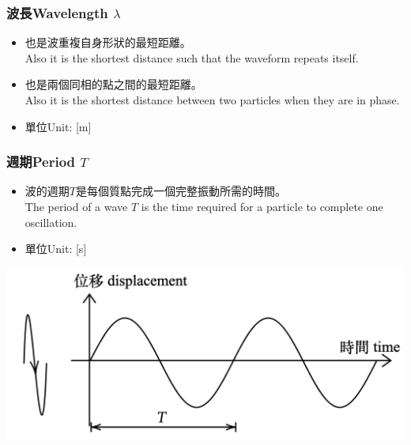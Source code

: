\documentclass[beamer=true]{standalone}
\begin{document}
\begin{frame}
    \frametitle{波長Wavelength $\lambda$}

    \begin{itemize}
        \item 也是波重複自身形狀的最短距離。\\Also it is the shortest distance such that the waveform repeats itself.
        \item 也是兩個同相的點之間的最短距離。\\Also it is the shortest distance between two particles when they are in phase.
        \item 單位Unit: [m]
    \end{itemize}
\end{frame}

\begin{frame}
    \frametitle{週期Period $T$}
    \begin{itemize}
        \item 波的週期$T$是每個質點完成一個完整振動所需的時間。\\The period of a wave $T$ is the time required for a particle to complete one oscillation.
        \item 單位Unit: [s]
    \end{itemize}
    \bigskip\par{\par\centering\includegraphics[width=.7\textwidth]{./img/ch1_2024-05-07-18-12-56.png}\par}
\end{frame}
\end{document}
